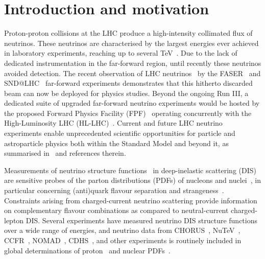 \section{Introduction and motivation}
\label{sec:introduction}

Proton-proton collisions at the LHC produce a high-intensity collimated flux of neutrinos.
%
These neutrinos are characterised by the largest energies ever achieved in laboratory experiments,
reaching up to several TeV~\cite{Kling:2021gos}.
%
Due to the lack of dedicated instrumentation in the far-forward region,
until recently these neutrinos avoided detection.
%
The recent observation of LHC neutrinos~\cite{FASER:2023zcr,SNDLHC:2023pun,CERN-FASER-CONF-2023-002} by the
  FASER~\cite{FASER:2019dxq,FASER:2022hcn} and SND@LHC~\cite{SHiP:2020sos,SNDLHC:2022ihg} far-forward experiments
demonstrates that this hitherto discarded beam can now be deployed for physics studies.
%
Beyond the ongoing Run III, a dedicated suite of upgraded far-forward
neutrino experiments would be hosted by the proposed
Forward Physics Facility (FPF)~\cite{Anchordoqui:2021ghd,Feng:2022inv} operating
concurrently with the High-Luminosity LHC (HL-LHC)~\cite{Azzi:2019yne,Cepeda:2019klc}.
%
Current and future LHC neutrino experiments enable unprecedented scientific opportunities
for particle and astroparticle physics both within the Standard Model and beyond it,
as summarised in~\cite{Anchordoqui:2021ghd,Feng:2022inv}
and references therein.

Measurements of neutrino structure functions~\cite{Conrad:1997ne,Mangano:2001mj,Candido:2023utz} in deep-inelastic scattering
(DIS) are sensitive probes of the parton distributions (PDFs)
of nucleons and nuclei~\cite{Ethier:2020way,Gao:2017yyd,Kovarik:2019xvh},  in particular
concerning (anti)quark  flavour separation and
strangeness~\cite{NuTeV:2007uwm,CCFR:1994ikl,Faura:2020oom,Alekhin:2014sya}.
%
Constraints arising from charged-current neutrino scattering provide information on
complementary flavour combinations as compared to neutral-current charged-lepton DIS.
%
Several  experiments have measured neutrino
DIS structure functions over a wide range of energies, and neutrino data
from CHORUS~\cite{CHORUS:2005cpn}, NuTeV~\cite{NuTeV:2001dfo},
CCFR~\cite{Yang:2000ju}, NOMAD~\cite{NOMAD:2013hbk}, CDHS~\cite{Berge:1989hr},
and other experiments is routinely  included in global
determinations of proton~\cite{NNPDF:2021njg,Hou:2019efy,Bailey:2020ooq} and nuclear
PDFs~\cite{Eskola:2021nhw,AbdulKhalek:2022fyi,Muzakka:2022wey}.


